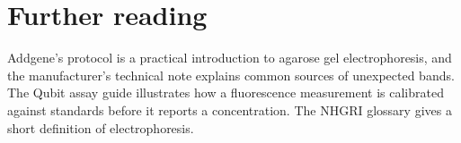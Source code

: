 \section*{Further reading}
Addgene's protocol is a practical introduction to agarose gel
electrophoresis,\cite{AddgeneGel} and the manufacturer's technical note explains
common sources of unexpected bands.\cite{NEBBands} The Qubit assay guide
illustrates how a fluorescence measurement is calibrated against standards
before it reports a concentration.\cite{ThermoQubit} The NHGRI glossary gives a
short definition of electrophoresis.\cite{NHGRIElectrophoresis}
